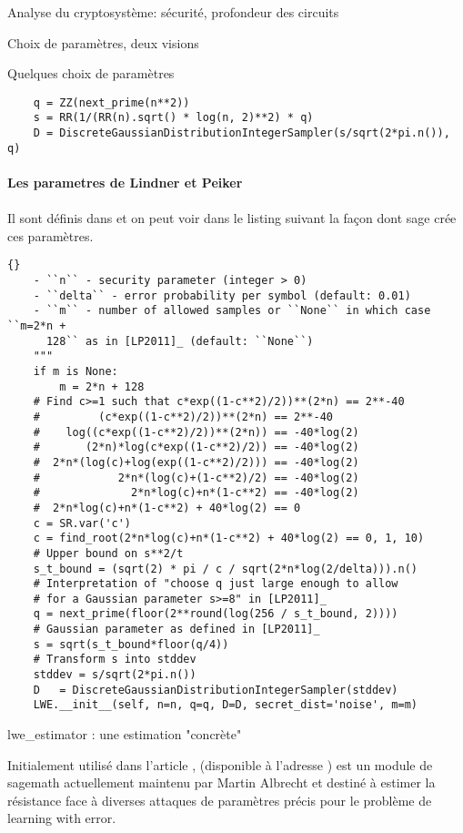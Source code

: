 \begin{section}{Analyse du cryptosystème: sécurité, profondeur des circuits}
\begin{subsection}{Choix de paramètres, deux visions}
\begin{subsubsection}{Quelques choix de paramètres}
	\begin{lstlisting}
	q = ZZ(next_prime(n**2))
	s = RR(1/(RR(n).sqrt() * log(n, 2)**2) * q)
	D = DiscreteGaussianDistributionIntegerSampler(s/sqrt(2*pi.n()), q)
	\end{lstlisting}

	\paragraph{}
	\textbf{Les parametres de Lindner et Peiker}
	\paragraph{}
	Il sont définis dans  \cite{EPRINT:LinPei10a} et on peut voir dans 
	le listing suivant la façon dont sage crée ces paramètres.
	\begin{lstlisting}{}
	- ``n`` - security parameter (integer > 0)
	- ``delta`` - error probability per symbol (default: 0.01)
	- ``m`` - number of allowed samples or ``None`` in which case ``m=2*n +
	  128`` as in [LP2011]_ (default: ``None``)
	"""
	if m is None:
	    m = 2*n + 128
	# Find c>=1 such that c*exp((1-c**2)/2))**(2*n) == 2**-40
	#         (c*exp((1-c**2)/2))**(2*n) == 2**-40
	#    log((c*exp((1-c**2)/2))**(2*n)) == -40*log(2)
	#       (2*n)*log(c*exp((1-c**2)/2)) == -40*log(2)
	#  2*n*(log(c)+log(exp((1-c**2)/2))) == -40*log(2)
	#            2*n*(log(c)+(1-c**2)/2) == -40*log(2)
	#              2*n*log(c)+n*(1-c**2) == -40*log(2)
	#  2*n*log(c)+n*(1-c**2) + 40*log(2) == 0
	c = SR.var('c')
	c = find_root(2*n*log(c)+n*(1-c**2) + 40*log(2) == 0, 1, 10)
	# Upper bound on s**2/t
	s_t_bound = (sqrt(2) * pi / c / sqrt(2*n*log(2/delta))).n()
	# Interpretation of "choose q just large enough to allow 
	# for a Gaussian parameter s>=8" in [LP2011]_
	q = next_prime(floor(2**round(log(256 / s_t_bound, 2))))
	# Gaussian parameter as defined in [LP2011]_
	s = sqrt(s_t_bound*floor(q/4))
	# Transform s into stddev
	stddev = s/sqrt(2*pi.n())
	D   = DiscreteGaussianDistributionIntegerSampler(stddev)
	LWE.__init__(self, n=n, q=q, D=D, secret_dist='noise', m=m)
	\end{lstlisting}

	\end{subsubsection}

	\begin{subsubsection}{lwe\_estimator : une estimation "concrète"}
	
		Initialement utilisé dans l'article
		\cite{EPRINT:AlbPlaSco15},
		(disponible à l'adresse \cite{estimator}) est un module de sagemath actuellement maintenu par
	Martin Albrecht et 
	destiné à estimer la résistance face à diverses attaques de paramètres précis pour
	le problème de learning with error.
	

\end{subsubsection}
\end{subsection}
\end{section}
